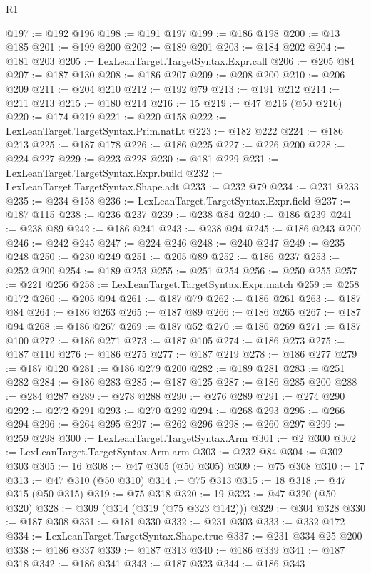 \begin{lexlean}{R1}
\begin{coremodule}
@197 := @192 @196
@198 := @191 @197
@199 := @186 @198
@200 := @13 @185
@201 := @199 @200
@202 := @189 @201
@203 := @184 @202
@204 := @181 @203
@205 := LexLeanTarget.TargetSyntax.Expr.call
@206 := @205 @84
@207 := @187 @130
@208 := @186 @207
@209 := @208 @200
@210 := @206 @209
@211 := @204 @210
@212 := @192 @79
@213 := @191 @212
@214 := @211 @213
@215 := @180 @214
@216 := 15
@219 := @47 @216 (@50 @216)
@220 := @174 @219
@221 := @220 @158
@222 := LexLeanTarget.TargetSyntax.Prim.natLt
@223 := @182 @222
@224 := @186 @213
@225 := @187 @178
@226 := @186 @225
@227 := @226 @200
@228 := @224 @227
@229 := @223 @228
@230 := @181 @229
@231 := LexLeanTarget.TargetSyntax.Expr.build
@232 := LexLeanTarget.TargetSyntax.Shape.adt
@233 := @232 @79
@234 := @231 @233
@235 := @234 @158
@236 := LexLeanTarget.TargetSyntax.Expr.field
@237 := @187 @115
@238 := @236 @237
@239 := @238 @84
@240 := @186 @239
@241 := @238 @89
@242 := @186 @241
@243 := @238 @94
@245 := @186 @243 @200
@246 := @242 @245
@247 := @224 @246
@248 := @240 @247
@249 := @235 @248
@250 := @230 @249
@251 := @205 @89
@252 := @186 @237
@253 := @252 @200
@254 := @189 @253
@255 := @251 @254
@256 := @250 @255
@257 := @221 @256
@258 := LexLeanTarget.TargetSyntax.Expr.match
@259 := @258 @172
@260 := @205 @94
@261 := @187 @79
@262 := @186 @261
@263 := @187 @84
@264 := @186 @263
@265 := @187 @89
@266 := @186 @265
@267 := @187 @94
@268 := @186 @267
@269 := @187 @52
@270 := @186 @269
@271 := @187 @100
@272 := @186 @271
@273 := @187 @105
@274 := @186 @273
@275 := @187 @110
@276 := @186 @275
@277 := @187 @219
@278 := @186 @277
@279 := @187 @120
@281 := @186 @279 @200
@282 := @189 @281
@283 := @251 @282
@284 := @186 @283
@285 := @187 @125
@287 := @186 @285 @200
@288 := @284 @287
@289 := @278 @288
@290 := @276 @289
@291 := @274 @290
@292 := @272 @291
@293 := @270 @292
@294 := @268 @293
@295 := @266 @294
@296 := @264 @295
@297 := @262 @296
@298 := @260 @297
@299 := @259 @298
@300 := LexLeanTarget.TargetSyntax.Arm
@301 := @2 @300
@302 := LexLeanTarget.TargetSyntax.Arm.arm
@303 := @232 @84
@304 := @302 @303
@305 := 16
@308 := @47 @305 (@50 @305)
@309 := @75 @308
@310 := 17
@313 := @47 @310 (@50 @310)
@314 := @75 @313
@315 := 18
@318 := @47 @315 (@50 @315)
@319 := @75 @318
@320 := 19
@323 := @47 @320 (@50 @320)
@328 := @309 (@314 (@319 (@75 @323 @142)))
@329 := @304 @328
@330 := @187 @308
@331 := @181 @330
@332 := @231 @303
@333 := @332 @172
@334 := LexLeanTarget.TargetSyntax.Shape.true
@337 := @231 @334 @25 @200
@338 := @186 @337
@339 := @187 @313
@340 := @186 @339
@341 := @187 @318
@342 := @186 @341
@343 := @187 @323
@344 := @186 @343

\end{coremodule}
\end{lexlean}
